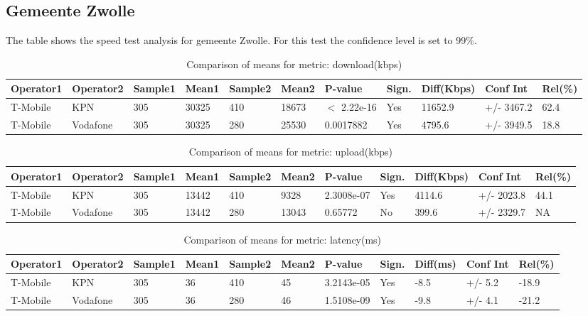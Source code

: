 \documentclass[]{article}
\begin{document}
\normalsize

\newpage

\subsection{Gemeente Zwolle}\label{gemeente-zwolle}

The table shows the speed test analysis for gemeente Zwolle. For this
test the confidence level is set to 99\%.

\begin{table}[ht]
\centering
{\footnotesize
\begin{tabular}{lllllllllll}
  \hline
Operator1 & Operator2 & Sample1 & Mean1 & Sample2 & Mean2 & P-value & Sign. & Diff(Kbps) & Conf Int & Rel(\%) \\ 
  \hline
T-Mobile & KPN & 305 & 30325 & 410 & 18673 & $<$ 2.22e-16 & Yes & 11652.9 & +/- 3467.2 & 62.4 \\ 
  T-Mobile & Vodafone & 305 & 30325 & 280 & 25530 & 0.0017882 & Yes & 4795.6 & +/- 3949.5 & 18.8 \\ 
   \hline
\end{tabular}
}
\caption{Comparison of means for metric: download(kbps)} 
\end{table}\begin{table}[ht]
\centering
{\footnotesize
\begin{tabular}{lllllllllll}
  \hline
Operator1 & Operator2 & Sample1 & Mean1 & Sample2 & Mean2 & P-value & Sign. & Diff(Kbps) & Conf Int & Rel(\%) \\ 
  \hline
T-Mobile & KPN & 305 & 13442 & 410 & 9328 & 2.3008e-07 & Yes & 4114.6 & +/- 2023.8 & 44.1 \\ 
  T-Mobile & Vodafone & 305 & 13442 & 280 & 13043 & 0.65772 & No & 399.6 & +/- 2329.7 & NA \\ 
   \hline
\end{tabular}
}
\caption{Comparison of means for metric: upload(kbps)} 
\end{table}\begin{table}[ht]
\centering
{\footnotesize
\begin{tabular}{lllllllllll}
  \hline
Operator1 & Operator2 & Sample1 & Mean1 & Sample2 & Mean2 & P-value & Sign. & Diff(ms) & Conf Int & Rel(\%) \\ 
  \hline
T-Mobile & KPN & 305 & 36 & 410 & 45 & 3.2143e-05 & Yes & -8.5 & +/- 5.2 & -18.9 \\ 
  T-Mobile & Vodafone & 305 & 36 & 280 & 46 & 1.5108e-09 & Yes & -9.8 & +/- 4.1 & -21.2 \\ 
   \hline
\end{tabular}
}
\caption{Comparison of means for metric: latency(ms)} 
\end{table}
\end{document}
